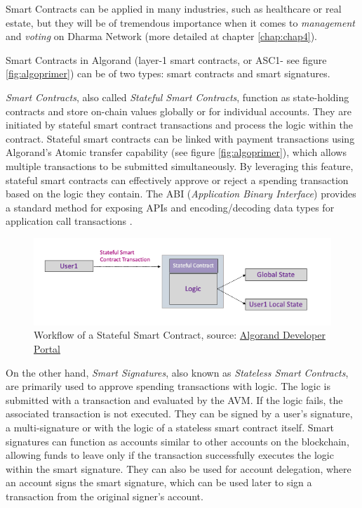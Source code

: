 Smart Contracts can be applied in many industries, such as healthcare or real estate, but they will be of tremendous importance when it comes to \textit{management} and \textit{voting} on Dharma Network (more detailed at chapter \ref{chap:chap4}).\newline

Smart Contracts in Algorand (layer-1 smart contracts, or ASC1- see figure \ref{fig:algoprimer}) can be of two types: smart contracts and smart signatures.\newline

\textit{Smart Contracts}, also called \textit{Stateful Smart Contracts}, function as state-holding contracts and store on-chain values globally or for individual accounts. They are initiated by stateful smart contract transactions and process the logic within the contract.\newline 
Stateful smart contracts can be linked with payment transactions using Algorand's Atomic transfer capability (see figure \ref{fig:algoprimer}), which allows multiple transactions to be submitted simultaneously. By leveraging this feature, stateful smart contracts can effectively approve or reject a spending transaction based on the logic they contain. The ABI (\textit{Application Binary Interface}) provides a standard method for exposing APIs and encoding/decoding data types for application call transactions \cite{scalgo, scalgo2}.\newline

\begin{figure}[htbp]
	\centering
	\includegraphics[scale=0.5]{figures/stateful.png}  %
	\caption{Workflow of a Stateful Smart Contract, source: \href{https://developer.algorand.org/articles/linking-algorand-stateful-and-stateless-smart-contracts/}{Algorand Developer Portal}}
	\label{fig:stateful}
\end{figure}

On the other hand, \textit{Smart Signatures}, also known as \textit{Stateless Smart Contracts}, are primarily used to approve spending transactions with logic. The logic is submitted with a transaction and evaluated by the AVM. If the logic fails, the associated transaction is not executed. They can be signed by a user's signature, a multi-signature or with the logic of a stateless smart contract itself. \newline
Smart signatures can function as accounts similar to other accounts on the blockchain, allowing funds to leave only if the transaction successfully executes the logic within the smart signature. They can also be used for account delegation, where an account signs the smart signature, which can be used later to sign a transaction from the original signer's account\cite{scalgo, scalgo2}.

